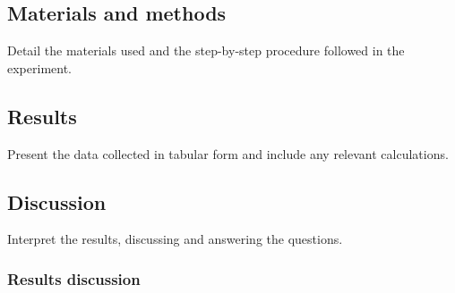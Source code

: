 \documentclass{article}
\begin{document}
\subsection{Materials and methods}
Detail the materials used and the step-by-step procedure followed in the experiment.

\subsection{Results}
Present the data collected in tabular form and include any relevant calculations.

\subsection{Discussion}
Interpret the results, discussing and answering the questions.

\subsubsection{Results discussion}
\end{document}
